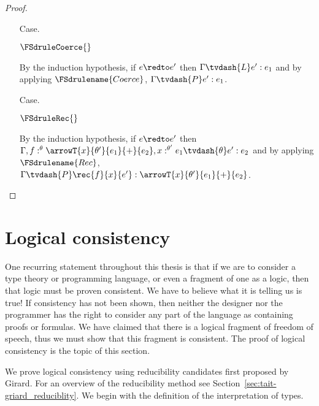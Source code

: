 \begin{proof}
\begin{itemize}
  \item[Case.]\ \\
    \begin{center}
      $\FSdruleCoerce{}$
    \end{center}
    By the induction hypothesis, if $e \redto e'$ then $\Gamma \tvdash{L} e':e_1$ and by applying
    $\FSdrulename{Coerce}$, $\Gamma \tvdash{P} e':e_1$.
    
  \item[Case.]\ \\
    \begin{center}
      $\FSdruleRec{}$
    \end{center}
    By the induction hypothesis, if $e \redto e'$ then 
    $\Gamma, f:^\theta \arrowT{x}{\theta'}{e_1}{+}{e_2},x:^{\theta'} e_1 \tvdash{\theta} e':e_2$ 
    and by applying $\FSdrulename{Rec}$,
    $\Gamma \tvdash{P} \rec{f}{x}{e'}:\arrowT{x}{\theta'}{e_1}{+}{e_2}$.
  \end{itemize}
\end{proof}

\section{Logical consistency}
\label{sec:logical_consistency}

One recurring statement throughout this thesis is that if we are to
consider a type theory or programming language, or even a fragment of
one as a logic, then that logic must be proven consistent.  We have to
believe what it is telling us is true!  If consistency has not been
shown, then neither the designer nor the programmer has the right to
consider any part of the language as containing proofs or formulas.
We have claimed that there is a logical fragment of freedom of speech,
thus we must show that this fragment is consistent.  The proof of
logical consistency is the topic of this section.

We prove logical consistency using reducibility candidates first
proposed by Girard.  For an overview of the reducibility method see
Section~\ref{sec:tait-griard_reduciblity}.  We begin with the
definition of the interpretation of types.

